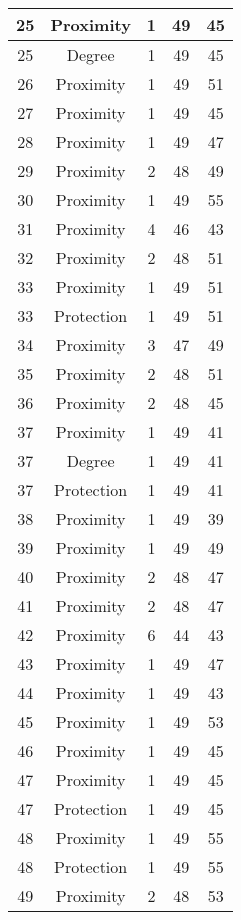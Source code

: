 \documentclass[results.tex]{subfiles}
\begin{document}
\begin{center}
\begin{tabular}{| c || c | c | c | c |}
    \hline
    25 & Proximity & 1 & 49 & 45 \\ 
    \hline
    25 & Degree & 1 & 49 & 45 \\ 
    \hline
    26 & Proximity & 1 & 49 & 51 \\ 
    \hline
    27 & Proximity & 1 & 49 & 45 \\ 
    \hline
    28 & Proximity & 1 & 49 & 47 \\ 
    \hline
    29 & Proximity & 2 & 48 & 49 \\ 
    \hline
    30 & Proximity & 1 & 49 & 55 \\ 
    \hline
    31 & Proximity & 4 & 46 & 43 \\ 
    \hline
    32 & Proximity & 2 & 48 & 51 \\ 
    \hline
    33 & Proximity & 1 & 49 & 51 \\ 
    \hline
    33 & Protection & 1 & 49 & 51 \\ 
    \hline
    34 & Proximity & 3 & 47 & 49 \\ 
    \hline
    35 & Proximity & 2 & 48 & 51 \\ 
    \hline
    36 & Proximity & 2 & 48 & 45 \\ 
    \hline
    37 & Proximity & 1 & 49 & 41 \\ 
    \hline
    37 & Degree & 1 & 49 & 41 \\ 
    \hline
    37 & Protection & 1 & 49 & 41 \\ 
    \hline
    38 & Proximity & 1 & 49 & 39 \\ 
    \hline
    39 & Proximity & 1 & 49 & 49 \\ 
    \hline
    40 & Proximity & 2 & 48 & 47 \\ 
    \hline
    41 & Proximity & 2 & 48 & 47 \\ 
    \hline
    42 & Proximity & 6 & 44 & 43 \\ 
    \hline
    43 & Proximity & 1 & 49 & 47 \\ 
    \hline
    44 & Proximity & 1 & 49 & 43 \\ 
    \hline
    45 & Proximity & 1 & 49 & 53 \\ 
    \hline
    46 & Proximity & 1 & 49 & 45 \\ 
    \hline
    47 & Proximity & 1 & 49 & 45 \\ 
    \hline
    47 & Protection & 1 & 49 & 45 \\ 
    \hline
    48 & Proximity & 1 & 49 & 55 \\ 
    \hline
    48 & Protection & 1 & 49 & 55 \\ 
    \hline
    49 & Proximity & 2 & 48 & 53 \\ 
    \hline   \end{tabular}
\end{center}
\end{document}
